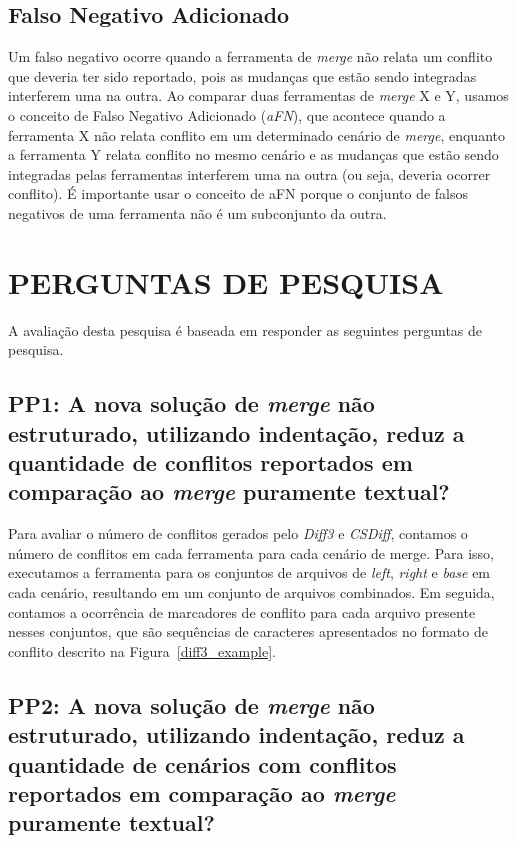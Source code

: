 \subsection{Falso Negativo Adicionado}
Um falso negativo ocorre quando a ferramenta de \emph{merge} não relata um
conflito que deveria ter sido reportado, pois as mudanças que estão sendo
integradas interferem uma na outra. Ao comparar duas ferramentas de
\emph{merge} X e Y, usamos o conceito de Falso Negativo Adicionado
(\emph{aFN}), que acontece quando a ferramenta X não relata conflito em um
determinado cenário de \emph{merge}, enquanto a ferramenta Y relata conflito no
mesmo cenário e as mudanças que estão sendo integradas pelas ferramentas
interferem uma na outra (ou seja, deveria ocorrer conflito). É importante usar
o conceito de aFN porque o conjunto de falsos negativos de uma ferramenta não é
um subconjunto da outra.

\section{PERGUNTAS DE PESQUISA}
A avaliação desta pesquisa é baseada em responder as seguintes perguntas de pesquisa.

\subsection{PP1: A nova solução de \emph{merge} não estruturado, utilizando
	indentação, reduz a quantidade de conflitos reportados em comparação ao
	\emph{merge} puramente textual?}

Para avaliar o número de conflitos gerados pelo \emph{Diff3} e \emph{CSDiff},
contamos o número de conflitos em cada ferramenta para cada cenário de merge.
Para isso, executamos a ferramenta para os conjuntos de arquivos de
\emph{left}, \emph{right} e \emph{base} em cada cenário, resultando em um
conjunto de arquivos combinados. Em seguida, contamos a ocorrência de
marcadores de conflito para cada arquivo presente nesses conjuntos, que são
sequências de caracteres apresentados no formato de conflito descrito na
Figura~\ref{diff3_example}.

\subsection{PP2: A nova solução de \emph{merge} não estruturado, utilizando
	indentação, reduz a quantidade de cenários com conflitos reportados em
	comparação ao \emph{merge} puramente textual?}

